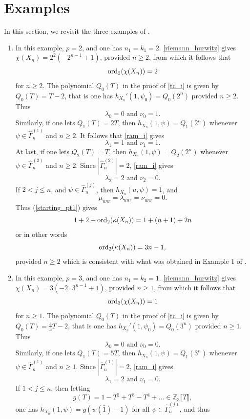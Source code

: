 \documentclass[11pt]{amsart}
\numberwithin{equation}{section}
\theoremstyle{remark}
\theoremstyle{definition}
\begin{document}
\section{Examples} \label{exa}
In this section, we revisit the three examples of \cite[\S 6]{Gambheera/Vallieres:2024}.
\begin{enumerate}
\item In this example, $p=2$, and one has $n_{1} = k_{1} = 2$.  \cref{riemann_hurwitz} gives $\chi(X_{n}) = 2^{2}(-2^{n-1} +1)$, provided $n \ge 2$, from which it follows that 
$${\rm ord}_{2}(\chi(X_{n})) = 2$$ 
for $n \ge 2$.  The polynomial $Q_{0}(T)$ in the proof of \cref{tc_i} is given by $Q_{0}(T) = T - 2$, that is one has $h_{X_{n}}'(1,\psi_{0}) = Q_{0}(2^{n})$ provided $n \ge 2$.  Thus
$$\lambda_{0} = 0 \text{ and } \nu_{0} = 1. $$ 
Similarly, if one lets $Q_{1}(T) = 2T$, then $h_{X_{n}}(1,\psi) = Q_{1}(2^{n})$ whenever $\psi \in \widehat{\Gamma}_{n}^{(1)}$ and $n \ge 2$.  It follows that \cref{ram_i} gives
$$\lambda_{1} = 1 \text{ and } \nu_{1} = 1. $$
At last, if one lets $Q_{2}(T) = T$, then $h_{X_{n}}(1,\psi) = Q_{2}(2^{n})$ whenever $\psi \in \widehat{\Gamma}_{n}^{(2)}$ and $n \ge 2$.  Since $|\widehat{\Gamma}_{n}^{(2)}| = 2$, \cref{ram_i} gives
$$\lambda_{2} = 2 \text{ and } \nu_{2} = 0. $$
If $2< j \le n$, and $\psi \in \widehat{\Gamma}_{n}^{(j)}$, then $h_{X_{n}}(u,\psi) = 1$, and 
$$\mu_{unr} = \lambda_{unr} = \nu_{unr} = 0. $$ 
Thus (\ref{starting_pt1}) gives
$$1 + 2 + {\rm ord}_{2}(\kappa(X_{n})) = 1 + (n+1) + 2n $$
or in other words
$${\rm ord}_{2}(\kappa(X_{n})) = 3n - 1, $$
provided $n \ge 2$ which is consistent with what was obtained in Example $1$ of \cite[\S 6]{Gambheera/Vallieres:2024}.
\item In this example, $p=3$, and one has $n_{1} = k_{2} = 1$.  \cref{riemann_hurwitz} gives $\chi(X_{n}) = 3(-2 \cdot 3^{n-1} +1)$, provided $n \ge 1$, from which it follows that 
$${\rm ord}_{3}(\chi(X_{n})) = 1$$ 
for $n \ge 1$.  The polynomial $Q_{0}(T)$ in the proof of \cref{tc_i} is given by $Q_{0}(T) = \frac{4}{3}T - 2$, that is one has $h_{X_{n}}'(1,\psi_{0}) = Q_{0}(3^{n})$ provided $n \ge 1$.  Thus
$$\lambda_{0} = 0 \text{ and } \nu_{0} = 0. $$ 
Similarly, if one lets $Q_{1}(T) = 5T$, then $h_{X_{n}}(1,\psi) = Q_{1}(3^{n})$ whenever $\psi \in \widehat{\Gamma}_{n}^{(1)}$ and $n \ge 1$.  Since $|\widehat{\Gamma}_{n}^{(1)}| = 2$, \cref{ram_i} gives
$$\lambda_{1} = 2 \text{ and } \nu_{1} = 0. $$
If $1< j \le n$, then letting 
$$g(T) = 1 - T^{2} + T^{3} - T^{4} + \ldots \in \mathbb{Z}_{3}\llbracket T \rrbracket, $$
one has $h_{X_{n}}(1,\psi) = g(\psi(\bar{1}) - 1)$ for all $\psi \in \widehat{\Gamma}_{n}^{(j)}$, and thus

\end{enumerate}
\end{document}

